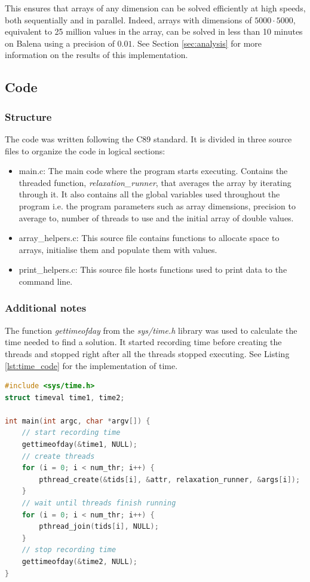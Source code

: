 \documentclass[letterpaper,12pt]{article}
\begin{document}
This ensures that arrays of any dimension can be solved efficiently at high speeds, both sequentially and in parallel. Indeed, arrays with dimensions of $5000\cdot5000$, equivalent to 25 million values in the array, can be solved in less than 10 minutes on Balena using a precision of $0.01$. See Section \ref{sec:analysis} for more information on the results of this implementation.

\subsection{Code}

\subsubsection{Structure}

The code was written following the C89 standard. It is divided in three source files to organize the code in logical sections:

\begin{itemize}
    \item main.c: The main code where the program starts executing. Contains the threaded function, \textit{relaxation\_runner}, that averages the array by iterating through it. It also contains all the global variables used throughout the program i.e. the program parameters such as array dimensions, precision to average to, number of threads to use and the initial array of double values.
    \item array\_helpers.c: This source file contains functions to allocate space to arrays, initialise them and populate them with values.
    \item print\_helpers.c: This source file hosts functions used to print data to the command line.
\end{itemize}

\subsubsection{Additional notes}

The function \textit{gettimeofday} from the \textit{sys/time.h} library \cite{c_systime} was used to calculate the time needed to find a solution. It started recording time before creating the threads and stopped right after all the threads stopped executing. See Listing \ref{lst:time_code} for the implementation of time.

\begin{lstlisting}[language=C, caption=Recording time (main.c), label={lst:time_code}]
#include <sys/time.h>
struct timeval time1, time2;

int main(int argc, char *argv[]) {
    // start recording time
	gettimeofday(&time1, NULL);
	// create threads
	for (i = 0; i < num_thr; i++) {
		pthread_create(&tids[i], &attr, relaxation_runner, &args[i]);
	}
	// wait until threads finish running
	for (i = 0; i < num_thr; i++) {
		pthread_join(tids[i], NULL);
	}
	// stop recording time
	gettimeofday(&time2, NULL); 
}
\end{lstlisting}
\end{document}
